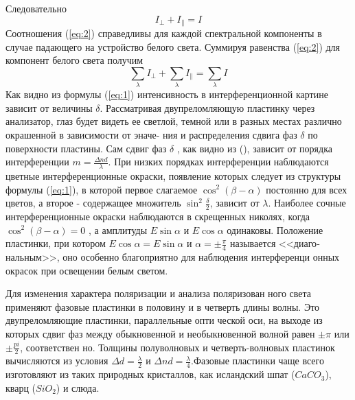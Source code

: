 Следовательно
\begin{equation}
\label{eq:2}
I_{\bot}+I_{\|}=I	
\end{equation}
Соотношения (\ref{eq:2}) справедливы для каждой спектральной компоненты в случае падающего на устройство белого света. Суммируя равенства (\ref{eq:2})
для компонент белого света получим
\begin{equation}
	\sum_{\lambda} I_{\bot}+\sum_{\lambda} I_{\|}=\sum_{\lambda} I
\end{equation}
Как видно из формулы (\ref{eq:1}) интенсивность в интерференционной
картине зависит от величины $\delta$. Рассматривая двупреломляющую
пластинку через анализатор, глаз будет видеть ее светлой, темной
или в разных местах различно окрашенной в зависимости от эначе-
ния и распределения сдвига фаз $\delta$ по поверхности пластины.
Сам сдвиг фаз $\delta$ , как видно из (), зависит от порядка интерференции
 $m=\frac{\Delta nd}{\lambda}$. При низких порядках интерферен­ции наблюдаются цветные интерференционные окраски, появление ко­торых следует из структуры формулы (\ref{eq:1}), в которой первое слага­емое $\cos^2(\beta-\alpha)$ постоянно для всех цветов, а второе -
содержащее множитель $\sin^2\frac{\delta}{2}$, зависит от $\lambda$. Наиболее сочные интерференционные окраски наблюдаются в скрещенных
николях, когда $\cos^2(\beta-\alpha)=0$ , а амплитуды $E\sin\alpha$
и $E\cos\alpha$ одинаковы. Положение пластинки, при котором
$E\cos\alpha=E\sin\alpha$ и $\alpha=\pm\frac{\pi}{4}$ называется <<диаго­
нальным>>, оно особенно благоприятно для наблюдения интерференци­
онных окрасок при освещении белым светом.

Для изменения характера поляризации и анализа поляризован­
ного света применяют фазовые пластинки в половину и в четверть
длины волны. Это двупреломляющие пластинки, параллельные опти­
ческой оси, на выходе из которых сдвиг фаз между обыкновенной и
необыкновенной волной равен $\pm\pi$ или $\pm\frac{pi}{2}$, соответствен­
но. Толщины полуволновых и четверть-волновых пластинок вычисляются из условия $\Delta d=\frac{\lambda}{2}$ и $\Delta nd=\frac{\lambda}{4}$.Фазовые
пластинки чаще всего изготовляют из таких природных кристаллов,
как исландский шпат ($CaCO_3$), кварц ($SiO_2$) и слюда.

